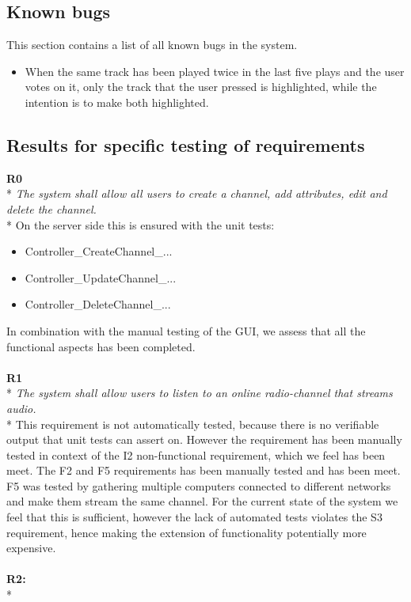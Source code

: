 \documentclass[a4paper,11pt,report]{article}
\begin{document}
\subsection{Known bugs}
This section contains a list of all known bugs in the system.
\begin{itemize}
\item When the same track has been played twice in the last five plays and the user votes on it, only the track that the user pressed is highlighted, while the intention is to make both highlighted.
\end{itemize}

\subsection{Results for specific testing of requirements}
\textbf{R0} \\*
\textit{The system shall allow all users to create a channel, add attributes, edit and delete the channel.} \\*
On the server side this is ensured with the unit tests:
\begin{itemize}
\item Controller\_CreateChannel\_...
\item Controller\_UpdateChannel\_...
\item Controller\_DeleteChannel\_...
\end{itemize}
In combination with the manual testing of the GUI, we assess that all the functional aspects has been completed.\\ \\
\textbf{R1} \\*
\textit{The system shall allow users to listen to an online radio-channel that streams audio.} \\*
This requirement is not automatically tested, because there is no verifiable output that unit tests can assert on. However the requirement has been manually tested in context of the I2 non-functional requirement, which we feel has been meet. The F2 and F5 requirements has been manually tested and has been meet. F5 was tested by gathering multiple computers connected to different networks and make them stream the same channel. For the current state of the system we feel that this is sufficient, however the lack of automated tests violates the S3 requirement, hence making the extension of functionality potentially more expensive. \\ \\
\textbf{R2:} \\*
\end{document}
